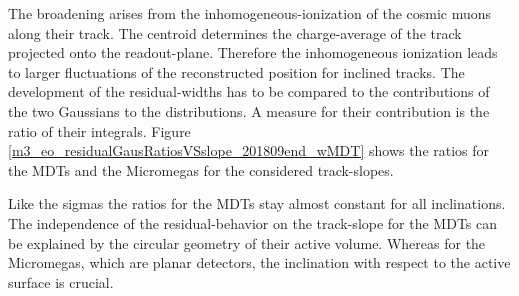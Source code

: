 \documentclass[
twoside,            %
BCOR1.4cm,          %
10pt,               %
headings=normal,    %
headsepline,        %
clearplainpage,		%
final,              %
div=14,
open=right,
bibliography=toc
]{scrreprt}
\begin{document}
The broadening arises from the inhomogeneous-ionization of the cosmic muons along their track.
The centroid determines the charge-average of the track projected onto the readout-plane. 
Therefore the inhomogeneous ionization leads to larger fluctuations of the reconstructed position for inclined tracks.
The development of the residual-widths has to be compared to the contributions of the two Gaussians to the distributions.
A measure for their contribution is the ratio of their integrals.
Figure \ref{m3_eo_residualGausRatiosVSslope_201809end_wMDT} shows the ratios for the MDTs and the Micromegas for the considered track-slopes.

Like the sigmas the ratios for the MDTs stay almost constant for all inclinations.
The independence of the residual-behavior on the track-slope for the MDTs can be explained by the circular geometry of their active volume.
Whereas for the Micromegas, which are planar detectors, the inclination with respect to the active surface is crucial.
\end{document}
